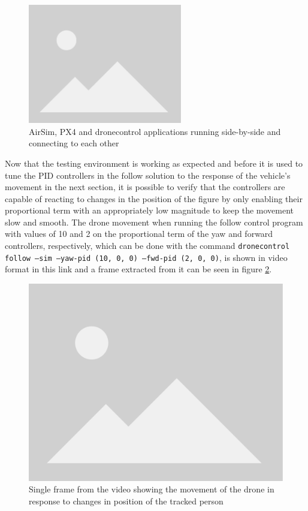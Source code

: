 \begin{figure}
  \centering
  \includegraphics[width=0.6\textwidth, keepaspectratio]{img/placeholder.png}
  \caption{AirSim, PX4 and dronecontrol applications running side-by-side and connecting to each other}
  \label{fig:airsim-sitl-pose}
\end{figure}

Now that the testing environment is working as expected and before it is used to tune the PID controllers in the follow solution to the response of the vehicle's movement in the next section, it is possible to verify that the controllers are capable of reacting to changes in the position of the figure by only enabling their proportional term with an appropriately low magnitude to keep the movement slow and smooth.
The drone movement when running the follow control program with values of 10 and 2 on the proportional term of the yaw and forward controllers, respectively, which can be done with the command \texttt{dronecontrol follow --sim --yaw-pid (10, 0, 0) --fwd-pid (2, 0, 0)}, is shown in video format in this link and a frame extracted from it can be seen in figure \ref{fig:airsim-test-follow}.


\begin{figure}
  \centering
  \includegraphics[width=.6\textwidth, keepaspectratio]{img/placeholder.png}
  \caption{Single frame from the video showing the movement of the drone in response to changes in position of the tracked person}
  \label{fig:airsim-test-follow}
\end{figure}